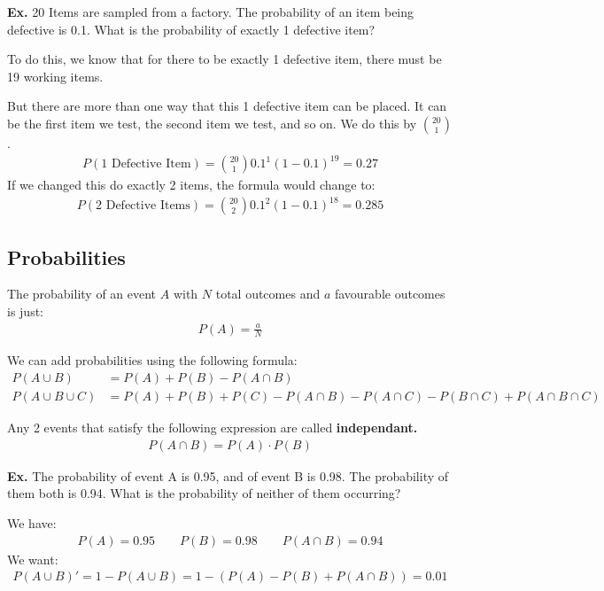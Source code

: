 \documentclass[12pt,letterpaper]{article} \usepackage{amsmath} \usepackage{graphicx} \usepackage[margin=1in]{geometry} \usepackage{longtable}  \usepackage{amssymb}
\begin{document}
	\begin{mdframed}
	\textbf{Ex. }20 Items are sampled from a factory. The probability of an item being defective is 0.1. What is the probability of exactly 1 defective item?
	
	To do this, we know that for there to be exactly 1 defective item, there must be 19 working items. 
	
	But there are more than one way that this 1 defective item can be placed. It can be the first item we test, the second item we test, and so on. We do this by $\binom{20}{1}$.
	\begin{align*}
		P(\text{1 Defective Item}) = \binom{20}{1} 0.1^1 (1-0.1)^{19} = 0.27
	\end{align*}
	If we changed this do exactly 2 items, the formula would change to:
	\begin{align*}
		P(\text{2 Defective Items}) = \binom{20}{2} 0.1^2 (1-0.1)^{18} = 0.285
	\end{align*}
	\end{mdframed}
	
	\subsection{Probabilities}
	The probability of an event $A$ with $N$ total outcomes and $a$ favourable outcomes is just:
	\begin{align*}
		P(A) = \frac{a}{N}
	\end{align*}
	
	We can add probabilities using the following formula:
	\begin{align*}
		P(A\cup B) &= P(A) + P(B) - P(A\cap B) \\
		P(A\cup B \cup C) &= P(A)+P(B)+P(C)-P(A\cap B) - P(A\cap C) - P(B\cap C) + P(A\cap B\cap C)
	\end{align*}

	Any 2 events that satisfy the following expression are called \textbf{independant. }
	\begin{align*}
		P(A\cap B) = P(A)\cdot P(B)
	\end{align*}

	\begin{mdframed}
		\textbf{Ex. }The probability of event A is 0.95, and of event B is 0.98. The probability of them both is 0.94. What is the probability of neither of them occurring?
		
		We have:
		\begin{align*}
			P(A)=0.95\qquad P(B)=0.98\qquad P(A\cap B)=0.94
		\end{align*}
		We want:
		\begin{align*}
			P(A\cup B)\prime = 1-P(A\cup B) = 1- (P(A) - P(B) + P(A\cap B)) = 0.01
		\end{align*}
	\end{mdframed}
\end{document}
